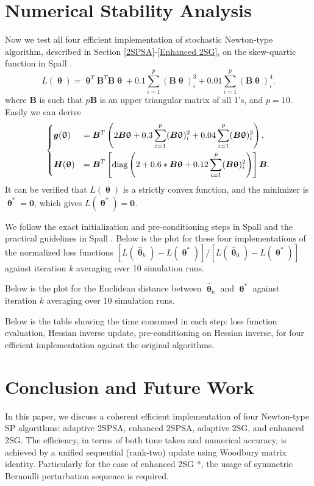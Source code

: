 \documentclass[conference]{IEEEtran}
\newcommand{\htheta}{\bm{\hat{\uptheta}}}
\begin{document}
	
	\section{Numerical Stability Analysis}
	Now we test all four efficient implementation of stochastic Newton-type algorithm, described in Section \ref{2SPSA}-\ref{Enhanced 2SG}, on the skew-quartic function in Spall \cite{Spall2009}.
	\begin{equation*}
		L(\bm{\uptheta})=\bm{\uptheta}^{T}\bm{B}^{T}\bm{B}\bm{\uptheta}+0.1 \sum_{i=1}^{p}  (\bm{B}\bm{\uptheta})_i^3  +0.01 \sum_{i=1}^{p}  (\bm{B}\bm{\uptheta})_i^4.
	\end{equation*}
	where $\bm{B}$ is such that $p\bm{B}$ is an upper triangular matrix of all 1's, and $p=10$. Easily we can derive
	\begin{equation}
		\begin{dcases}
			\bm{g}(\bm{\uptheta})&=\bm{B}^{T}\left( 2\bm{B}\bm{\uptheta}+0.3 \sum_{i=1}^{p}(\bm{B}\bm{\uptheta})_i^2 +0.04\sum_{i=1}^{p}(\bm{B}\bm{\uptheta})_i^3\right),\\
			\bm{H}(\bm{\uptheta})&=\bm{B}^{T}\left[\text{diag}\left(2+0.6*\bm{B}\bm{\uptheta}+0.12\sum_{i=1}^{p}(\bm{B}\bm{\uptheta})_i^2\right)\right]\bm{B}.\\
		\end{dcases}
	\end{equation}
	It can be verified that $L(\bm{\uptheta})$ is a strictly convex function, and the minimizer is $\bm{\uptheta}^{*}=\bm{0}$, which gives $L(\bm{\uptheta}^{*})=\bm{0}$.
	
	We follow the exact initialization and pre-conditioning steps in Spall \cite{Spall2009} and the practical guidelines in Spall \cite{Spall2000}. Below is the plot for these four implementations of the normalized loss functions $[L(\htheta_k)-L(\bm{\uptheta}^{*})]/[L(\htheta_0)-L(\bm{\uptheta}^{*})]$ against iteration $k$ averaging over 10 simulation runs.
	
	
	Below is the plot for the Euclidean distance between $\htheta_k$ and $\bm{\uptheta}^{*}$ against iteration $k$ averaging over 10 simulation runs.
		
	Below is the table showing the time consumed in each step: loss function evaluation, Hessian inverse update, pre-conditioning on Hessian inverse, for four efficient implementation against the original algorithms.
		
	\section{Conclusion and Future Work}
	In this paper, we discuss a coherent efficient implementation of four Newton-type SP algorithms: adaptive 2SPSA, enhanced 2SPSA, adaptive 2SG, and enhanced 2SG. The efficiency, in terms of both time taken and numerical accuracy, is achieved by a unified sequential (rank-two) update using Woodbury matrix identity. Particularly for the case of enhanced 2SG *, the usage of symmetric Bernoulli perturbation sequence is required. 
	
\end{document}
